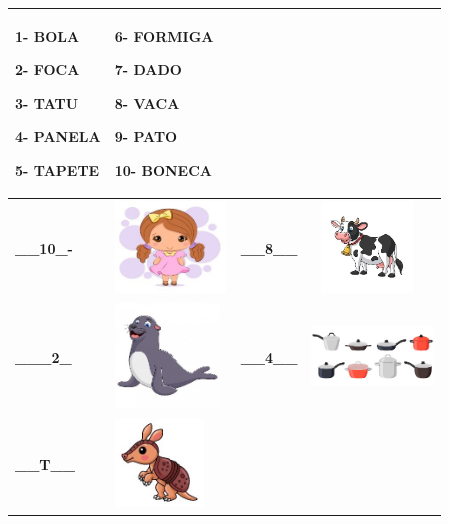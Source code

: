 \begin{longtable}[]{@{}llll@{}}
\toprule
\begin{minipage}[b]{0.24\columnwidth}\raggedright\strut
\textbf{1- BOLA}

\textbf{2- FOCA}

\textbf{3- TATU}

\textbf{4- PANELA}

\textbf{5- TAPETE}\strut
\end{minipage} & \begin{minipage}[b]{0.24\columnwidth}\raggedright\strut
\textbf{6- FORMIGA}

\textbf{7- DADO}

\textbf{8- VACA}

\textbf{9- PATO}

\textbf{10- BONECA}\strut
\end{minipage}\tabularnewline
\midrule
\endhead
\textbf{\_\_10\_-} &
\includegraphics[width=1.16667in,height=0.96319in]{media/image16.jpeg} &
\textbf{\_\_8\_\_} &
\includegraphics[width=1.16127in,height=0.95833in]{media/image17.jpeg}\tabularnewline
\textbf{\_\_\_2\_} &
\includegraphics[width=1.09375in,height=1.09375in]{media/image18.jpeg} &
\textbf{\_\_4\_\_} &
\includegraphics[width=1.27986in,height=0.98958in]{media/image19.jpeg}\tabularnewline
\textbf{\_\_T\_\_} &
\includegraphics[width=0.92708in,height=0.92708in]{media/image20.jpeg} &

\end{longtable}
